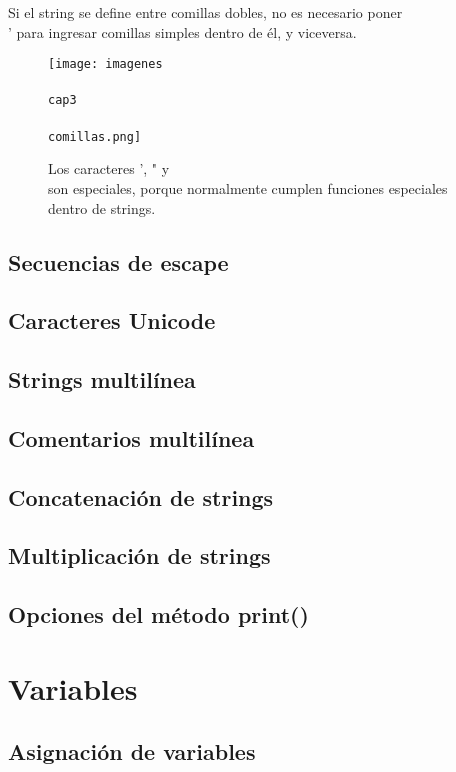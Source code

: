 \documentclass{article}
\begin{document}
Si el string se define entre comillas dobles, no es necesario poner \\' para ingresar comillas simples dentro de él, y viceversa.

\begin{figure}[ht!]
  \texttt{[image: imagenes\\\\cap3\\\\comillas.png]}
  \caption{Los caracteres ', " y \\ son especiales, porque normalmente cumplen funciones especiales dentro de strings.}
\end{figure}

\subsection{Secuencias de escape}

\subsection{Caracteres Unicode}

\subsection{Strings multilínea}

\subsection{Comentarios multilínea}

\subsection{Concatenación de strings}

\subsection{Multiplicación de strings}

\subsection{Opciones del método print()}

\section{Variables}

\subsection{Asignación de variables}
\end{document}
